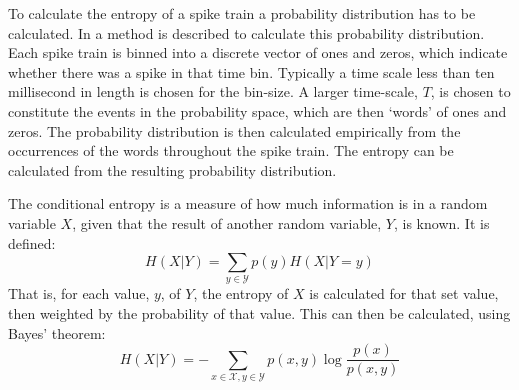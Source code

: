 To calculate the entropy of a spike train a probability distribution has to be calculated.  In \citep{BialekEtAl1998a} a method is described to calculate this probability distribution.  Each spike train is binned into a discrete vector of ones and zeros, which indicate whether there was a spike in that time bin. Typically a time scale less than ten millisecond in length is chosen for the bin-size. A larger time-scale, $T$, is chosen to constitute the events in the probability space, which are then \lq{}words\rq{} of ones and zeros. The probability distribution is then calculated empirically from the occurrences of the words throughout the spike train. The entropy can be calculated from the resulting probability distribution.

The conditional entropy is a measure of how much information is in a random variable $X$, given that the result of another random variable, $Y$, is known.  It is defined:
\begin{equation}
H(X| Y) = \sum_{y \in \mathcal{Y}}p(y) H(X|Y=y)
\end{equation}
That is, for each value, $y$, of $Y$, the entropy of $X$ is calculated for that set value, then weighted by the probability of that value. This can then be calculated, using Bayes' theorem:
\begin{equation}
H(X |Y) = - \sum_{x\in \mathcal{X}, y \in \mathcal{Y}} p(x,y) \log \frac{p(x)}{p(x,y)}
\end{equation}

